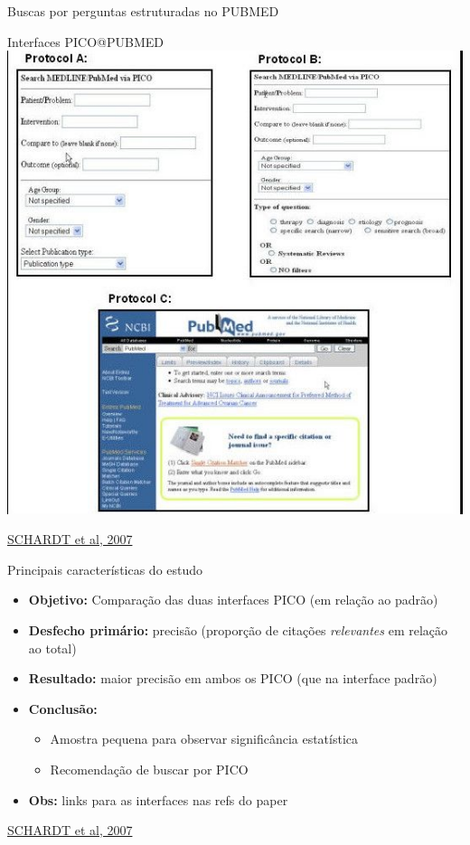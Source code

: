 \documentclass{beamer}
\begin{document}
\begin{frame}{\footnotesize Buscas por perguntas estruturadas no PUBMED}
  \begin{exampleblock}{Interfaces PICO@PUBMED}
    \centering
    \includegraphics[height=.8\textheight]{Busca/pubmed-pico}
  \end{exampleblock}

  \vfill
  \tiny
  \hfill \href{https://doi.org/10.1186/1472-6947-7-16}{SCHARDT et al, 2007}
\end{frame}

\begin{frame}{\footnotesize Principais características do estudo}
  \begin{itemize}
    \footnotesize
  \item {\bf Objetivo:} Comparação das duas interfaces PICO ({\tiny em relação ao padrão})
    \bigskip
  \item {\bf Desfecho primário:} precisão ({\tiny proporção de citações {\em relevantes} em relação ao total})
    \bigskip
  \item {\bf Resultado:} maior precisão em ambos os PICO ({\tiny que na interface padrão})
    \bigskip
  \item {\bf Conclusão:}
    \begin{itemize}
      \scriptsize
    \item Amostra pequena para observar significância estatística
    \item Recomendação de buscar por PICO
    \end{itemize}
    \bigskip
  \item {\bf Obs:} links para as interfaces nas refs do paper
  \end{itemize}

  \vfill
  \tiny
  \hfill \href{https://doi.org/10.1186/1472-6947-7-16}{SCHARDT et al, 2007}
\end{frame}
\end{document}

